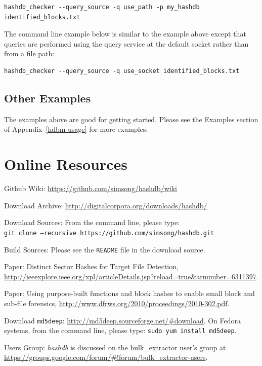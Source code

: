 \documentclass[11pt,twoside]{article}
\newcommand \hdb {\textit{hashdb}\xspace}
\begin{document}
\begin{small}
\begin{verbatim}
hashdb_checker --query_source -q use_path -p my_hashdb identified_blocks.txt
\end{verbatim}
\end{small}

The command line example below is similar to the example above
except that queries are performed
using the query service at the default socket rather than from a file path:

\begin{small}
\begin{verbatim}
hashdb_checker --query_source -q use_socket identified_blocks.txt
\end{verbatim}
\end{small}

\subsection{Other Examples}
The examples above are good for getting started.
Please see the Examples section of Appendix~\ref{hdbm-usage}
for more examples.

\section{Online Resources}
\begin{compactitem}	
\item Github Wiki: \url{https://github.com/simsong/hashdb/wiki}
\item Download Archive: \url{http://digitalcorpora.org/downloads/hashdb/}
\item Download Sources: From the command line, please type: \\
\texttt{git clone --recursive https://github.com/simsong/hashdb.git}
\item Build Sources: Please see the \texttt{README} file in the download source.
\item Paper: Distinct Sector Hashes for Target File Detection,
\url{http://ieeexplore.ieee.org/xpl/articleDetails.jsp?reload=true&arnumber=6311397}.
\item Paper: Using purpose-built functions and block hashes to enable small block and sub-file forensics,
\url{http://www.dfrws.org/2010/proceedings/2010-302.pdf}.
\item Download \texttt{md5deep}: \url{http://md5deep.sourceforge.net/#download}.
On Fedora systems, from the command line, please type: \texttt{sudo yum install md5deep}.
\item Users Group: \hdb is discussed on the bulk\_extractor user's group
at \url{https://groups.google.com/forum/#!forum/bulk\_extractor-users}.
\end{compactitem}
\end{document}
